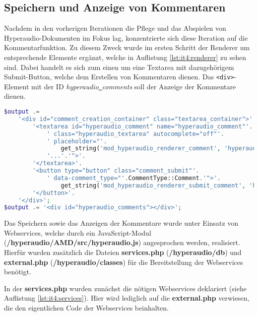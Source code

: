 \subsection{Speichern und Anzeige von Kommentaren}
\label{sub:SpeichernKommentare}
Nachdem in den vorherigen Iterationen die Pflege und das Abspielen von Hyperaudio-Dokumenten im Fokus lag, konzentrierte sich diese Iteration auf die Kommentarfunktion. Zu diesem Zweck wurde im ersten Schritt der Renderer um entsprechende Elemente ergänzt, welche in Auflistung \ref{lst:it4:renderer} zu sehen sind. Dabei handelt es sich zum einen um eine Textarea mit dazugehörigem Submit-Button, welche dem Erstellen von Kommentaren dienen. Das \texttt{<div>}-Element mit der ID \mbox{\textit{hyperaudio\underline{{ }}comments}} soll der Anzeige der Kommentare dienen.

\begin{lstlisting}[language=php,
             linewidth=\textwidth,
             caption={Ausschnitt der \textbf{renderer.php} in der 4. Iteration},
             label={lst:it4:renderer}]
$output .=
    '<div id="comment_creation_container" class="textarea_container">'.
        '<textarea id="hyperaudio_comment" name="hyperaudio_comment"'.
            ' class="hyperaudio_textarea" autocomplete="off"'.
            ' placeholder="'.
                get_string('mod_hyperaudio_renderer_comment', 'hyperaudio').
            '...'.'">'.
        '</textarea>'.
        '<button type="button" class="comment_submit"'.
            ' data-comment_type="'.CommentType::Comment.'">'.
                get_string('mod_hyperaudio_renderer_submit_comment', 'hyperaudio').
        '</button>'.
    '</div>';
$output .= '<div id="hyperaudio_comments"></div>';
\end{lstlisting}

Das Speichern sowie das Anzeigen der Kommentare wurde unter Einsatz von Webservices, welche durch ein JavaScript-Modul (\textbf{/hyperaudio/AMD/src/hyperaudio.js}) angesprochen werden, realisiert. Hierfür wurden zusätzlich die Dateien \textbf{services.php} (\textbf{/hyperaudio/db}) und \textbf{external.php} (\textbf{/hyperaudio/classes}) für die Bereitstellung der Webservices benötigt.

In der \textbf{services.php} wurden zunächst die nötigen Webservices deklariert (siehe Auflistung \ref{lst:it4:services}). Hier wird lediglich auf die \textbf{external.php} verwiesen, die den eigentlichen Code der Webservices beinhalten.

